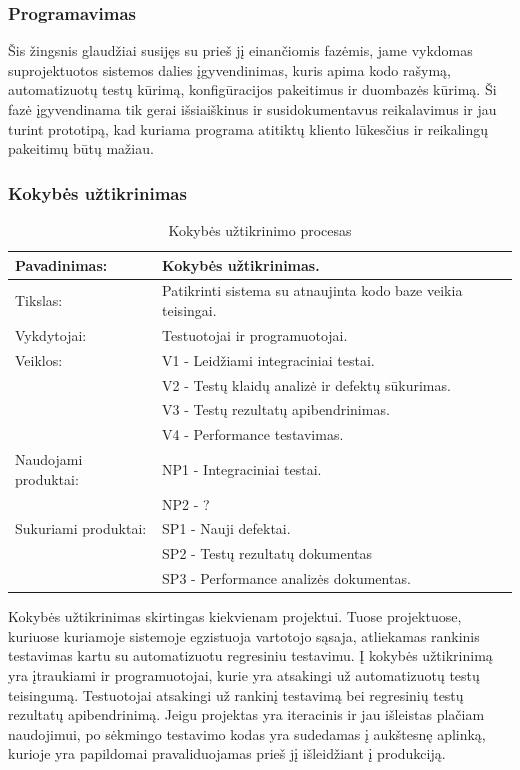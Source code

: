 \documentclass{VUMIFPSkursinis}
\begin{document}
	\subsubsection{Programavimas}
	Šis žingsnis glaudžiai susijęs su prieš jį einančiomis fazėmis, jame vykdomas suprojektuotos sistemos dalies įgyvendinimas, kuris apima kodo rašymą, automatizuotų testų kūrimą, konfigūracijos pakeitimus ir duombazės kūrimą. Ši fazė įgyvendinama tik gerai išsiaiškinus ir susidokumentavus reikalavimus ir jau turint prototipą, kad kuriama programa atitiktų kliento lūkesčius ir reikalingų pakeitimų būtų mažiau.
	\subsubsection{Kokybės užtikrinimas}
	\begin{center}
		\begin{table}[ht]
		\caption{Kokybės užtikrinimo procesas}
		\begin{tabular}{ | l | l | } 
		\hline
		Pavadinimas:         & Kokybės užtikrinimas.                                       \\ \hline
		Tikslas: 	           & Patikrinti sistema su atnaujinta kodo baze veikia teisingai. \\ \hline
		Vykdytojai:          & Testuotojai ir programuotojai.                                \\ \hline
		Veiklos:             & V1 - Leidžiami integraciniai testai. 													\\
						             & V2 - Testų klaidų analizė ir defektų sūkurimas. 								 \\
					 	             & V3 - Testų rezultatų apibendrinimas. 														\\ 
						    				 & V4 - Performance testavimas. 																		 \\ \hline
		Naudojami produktai: & NP1 - Integraciniai testai. 																				\\
												 & NP2 - ?																													 \\ \hline
		Sukuriami produktai: & SP1 - Nauji defektai. 																								\\
												 & SP2 - Testų rezultatų dokumentas 																	 \\
												 & SP3 - Performance analizės dokumentas. 															\\ \hline
		\end{tabular}
	\end{table}
		\end{center}
	Kokybės užtikrinimas skirtingas kiekvienam projektui. Tuose projektuose, kuriuose kuriamoje sistemoje egzistuoja vartotojo sąsaja, atliekamas rankinis testavimas kartu su automatizuotu regresiniu testavimu. Į kokybės užtikrinimą yra įtraukiami ir programuotojai, kurie yra atsakingi už automatizuotų testų teisingumą. Testuotojai atsakingi už rankinį testavimą bei regresinių testų rezultatų apibendrinimą. Jeigu projektas yra iteracinis ir jau išleistas plačiam naudojimui, po sėkmingo testavimo kodas yra sudedamas į aukštesnę aplinką, kurioje yra papildomai pravaliduojamas prieš jį išleidžiant į produkciją.
\end{document}
